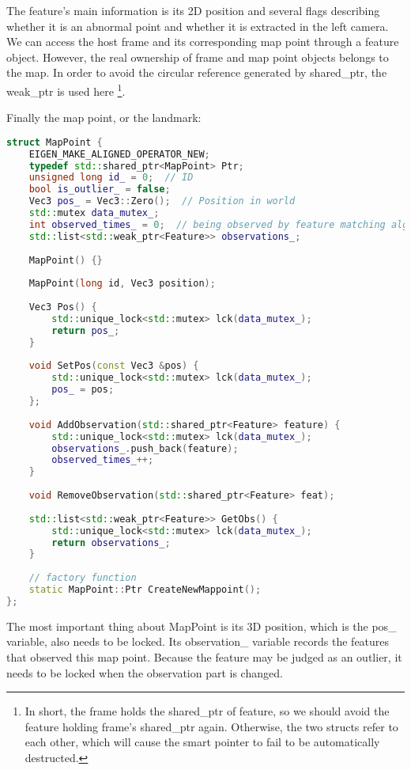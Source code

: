 The feature's main information is its 2D position and several flags describing whether it is an abnormal point and whether it is extracted in the left camera. We can access the host frame and its corresponding map point through a feature object. However, the real ownership of frame and map point objects belongs to the map. In order to avoid the circular reference generated by shared\_ptr, the weak\_ptr is used here \footnote{In short, the frame holds the shared\_ptr of feature, so we should avoid the feature holding frame's shared\_ptr again. Otherwise, the two structs refer to each other, which will cause the smart pointer to fail to be automatically destructed. }.

Finally the map point, or the landmark:
\begin{lstlisting}[language=c++,caption=slambook2/ch13/include/myslam/mappoint.h]
struct MapPoint {
	EIGEN_MAKE_ALIGNED_OPERATOR_NEW;
	typedef std::shared_ptr<MapPoint> Ptr;
	unsigned long id_ = 0;  // ID
	bool is_outlier_ = false;
	Vec3 pos_ = Vec3::Zero();  // Position in world
	std::mutex data_mutex_;
	int observed_times_ = 0;  // being observed by feature matching algo.
	std::list<std::weak_ptr<Feature>> observations_;
	
	MapPoint() {}
	
	MapPoint(long id, Vec3 position);
	
	Vec3 Pos() {
		std::unique_lock<std::mutex> lck(data_mutex_);
		return pos_;
	}
	
	void SetPos(const Vec3 &pos) {
		std::unique_lock<std::mutex> lck(data_mutex_);
		pos_ = pos;
	};
	
	void AddObservation(std::shared_ptr<Feature> feature) {
		std::unique_lock<std::mutex> lck(data_mutex_);
		observations_.push_back(feature);
		observed_times_++;
	}
	
	void RemoveObservation(std::shared_ptr<Feature> feat);
	
	std::list<std::weak_ptr<Feature>> GetObs() {
		std::unique_lock<std::mutex> lck(data_mutex_);
		return observations_;
	}
	
	// factory function
	static MapPoint::Ptr CreateNewMappoint();
};
\end{lstlisting}

The most important thing about MapPoint is its 3D position, which is the pos\_ variable, also needs to be locked. Its observation\_ variable records the features that observed this map point. Because the feature may be judged as an outlier, it needs to be locked when the observation part is changed.

